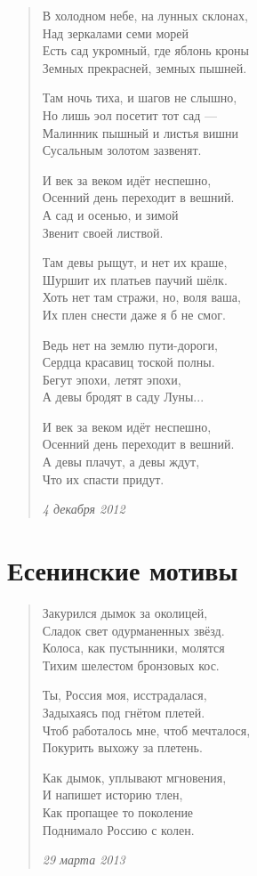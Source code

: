 \documentclass[a4paper,12pt,fleqn]{book}\usepackage{polyglossia}\setdefaultlanguage[babelshorthands=true]{russian}\setotherlanguage{english}\defaultfontfeatures{Ligatures=TeX,Mapping=tex-text}\usepackage{xcolor}\newcommand{\ml}[3]{#2}
\begin{document}
\begin{verse}
В холодном небе, на лунных склонах,\\
Над зеркалами семи морей\\
Есть сад укромный, где яблонь кроны\\
Земных прекрасней, земных пышней.

Там ночь тиха, и шагов не слышно,\\
Но лишь эол посетит тот сад ---\\
Малинник пышный и листья вишни\\
Сусальным золотом зазвенят.

И век за веком идёт неспешно,\\
Осенний день переходит в вешний.\\
А сад и осенью, и зимой\\
Звенит своей листвой.

Там девы рыщут, и нет их краше,\\
Шуршит их платьев паучий шёлк.\\
Хоть нет там стражи, но, воля ваша,\\
Их плен снести даже я б не смог.

Ведь нет на землю пути-дороги,\\
Сердца красавиц тоской полны.\\
Бегут эпохи, летят эпохи,\\
А девы бродят в саду Луны...

И век за веком идёт неспешно,\\
Осенний день переходит в вешний.\\
А девы плачут, а девы ждут,\\
Что их спасти придут.

\emph{4 декабря 2012}
\end{verse}
\newpage

\section{Есенинские мотивы}

\begin{verse}
Закурился дымок за околицей,\\
Сладок свет одурманенных звёзд.\\
Колоса, как пустынники, молятся\\
Тихим шелестом бронзовых кос.

Ты, Россия моя, исстрадалася,\\
Задыхаясь под гнётом плетей.\\
Чтоб работалось мне, чтоб мечталося,\\
Покурить выхожу за плетень.

Как дымок, уплывают мгновения,\\
И напишет историю тлен,\\
Как пропащее то поколение\\
Поднимало Россию с колен.

\emph{29 марта 2013}
\end{verse}
\newpage
\end{document}
